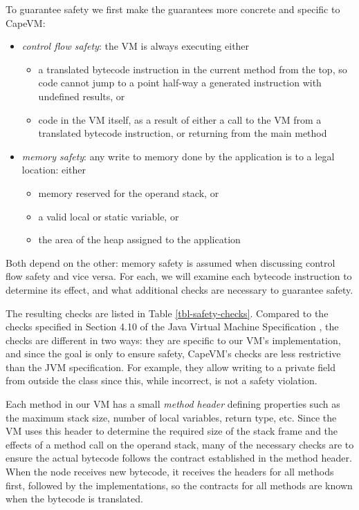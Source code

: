 To guarantee safety we first make the guarantees more concrete and specific to CapeVM:

\begin{itemize}
    \item \emph{control flow safety}: the VM is always executing either
        \begin{itemize}
            \item a translated bytecode instruction in the current method from the top, so code cannot jump to a point half-way a generated instruction with undefined results, or
            \item code in the VM itself, as a result of either a call to the VM from a translated bytecode instruction, or returning from the main method
        \end{itemize}
    \item \emph{memory safety}: any write to memory done by the application is to a legal location: either
        \begin{itemize}
            \item memory reserved for the operand stack, or
            \item a valid local or static variable, or
            \item the area of the heap assigned to the application
        \end{itemize}
\end{itemize}

Both depend on the other: memory safety is assumed when discussing control flow safety and vice versa. For each, we will examine each bytecode instruction to determine its effect, and what additional checks are necessary to guarantee safety.

The resulting checks are listed in Table \ref{tbl-safety-checks}. Compared to the checks specified in Section 4.10 of the Java Virtual Machine Specification \cite{Lindholm:2017vu}, the checks are different in two ways: they are specific to our VM's implementation, and since the goal is only to ensure safety, CapeVM's checks are less restrictive than the JVM specification. For example, they allow writing to a private field from outside the class since this, while incorrect, is not a safety violation. 

Each method in our VM has a small \emph{method header} defining properties such as the maximum stack size, number of local variables, return type, etc. Since the VM uses this header to determine the required size of the stack frame and the effects of a method call on the operand stack, many of the necessary checks are to ensure the actual bytecode follows the contract established in the method header. When the node receives new bytecode, it receives the headers for all methods first, followed by the implementations, so the contracts for all methods are known when the bytecode is translated.


